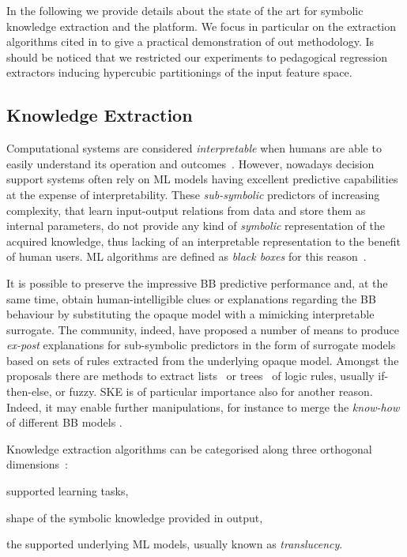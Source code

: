\documentclass[
]{ceurart}
\begin{document}
In the following we provide details about the state of the art for symbolic knowledge extraction and the \psyke{} platform.
%
We focus in particular on the extraction algorithms cited in  to give a practical demonstration of out methodology.
%
Is should be noticed that we restricted our experiments to pedagogical regression extractors inducing hypercubic partitionings of the input feature space.

\subsection{Knowledge Extraction}\label{ssec:extraction}

Computational systems are considered \emph{interpretable} when humans are able to easily understand its operation and outcomes~\cite{agentbasedxai-aamas2020}.
%
However, nowadays decision support systems often rely on ML models having excellent predictive capabilities at the expense of interpretability.
%
These \emph{sub-symbolic} predictors of increasing complexity, that learn input-output relations from data and store them as internal parameters, do not provide any kind of \emph{symbolic} representation of the acquired knowledge, thus lacking of an interpretable representation to the benefit of human users.
%
ML algorithms are defined as \emph{black boxes} for this reason~\cite{Lipton2018}.

It is possible to preserve the impressive BB predictive performance and, at the same time, obtain human-intelligible clues or explanations regarding the BB behaviour by substituting the opaque model with a mimicking interpretable surrogate.
%
The \xai{} community, indeed, have proposed a number of means to produce \emph{ex-post} explanations for sub-symbolic predictors in the form of surrogate models based on sets of rules extracted from the underlying opaque model.
%
Amongst the proposals there are methods to extract lists~\cite{craven1994using,huysmans2006iter,gridex-extraamas2021} or trees~\cite{craven1996extracting,breiman1984classification} of logic rules, usually if-then-else, \mofn{} or fuzzy.
%
SKE is of particular importance also for another reason.
%
Indeed, it may enable further manipulations, for instance to merge the \emph{know-how} of different BB models \cite{xmas-aiiot2019}.

Knowledge extraction algorithms can be categorised along three orthogonal dimensions~\cite{xaisurvey-ia14}:
%
\begin{inlinelist}
    \item\label{item:category:learning-task} supported learning tasks,
    \item\label{item:category:knowledge-form} shape of the symbolic knowledge provided in output,
    \item\label{item:category:translucency} the supported underlying ML models, usually known as \emph{translucency}.
\end{inlinelist}
\end{document}
